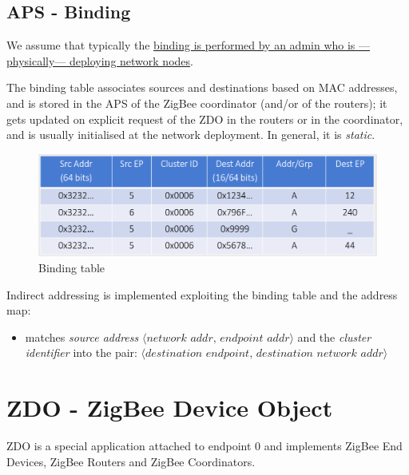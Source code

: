 \subsection{APS - Binding}
We assume that typically the \ul{binding is performed by an admin who is ---physically--- deploying network nodes}. 

The binding table associates sources and destinations based on MAC addresses, and is stored in the APS of the ZigBee coordinator (and/or of the routers); it gets updated on explicit request of the ZDO in the routers or in the
coordinator, and is usually initialised at the network deployment.
In general, it is \textit{static}.

\begin{figure}[htbp]
   \centering
   \includegraphics{images/zigbee_bindingtable.png}
   \caption{Binding table}
   \label{fig:zigbee_bindingtable}
\end{figure}

Indirect addressing is implemented exploiting the binding table and the address map:
\begin{itemize}
   \item 
   matches \textit{source address} $\langle \textit{network addr, endpoint addr}\rangle$ and the
   \textit{cluster identifier} into the pair:
   $\langle \textit{destination endpoint, destination network addr}\rangle$
\end{itemize}

\section{ZDO - ZigBee Device Object}
ZDO is a special application attached to endpoint 0 and  implements ZigBee End Devices, ZigBee Routers and
ZigBee Coordinators.

